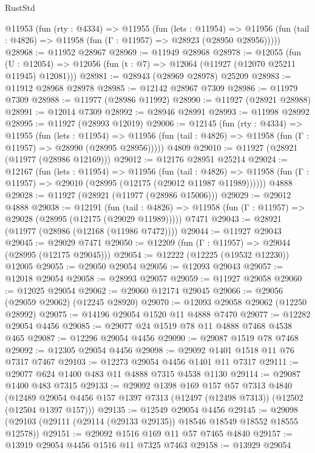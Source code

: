 \begin{lexlean}{RustStd}
\begin{coremodule}
  @11953
    (fun (rty : @4334) =>
    @11955
      (fun (lets : @11954) =>
      @11956 (fun (tail : @4826) => @11958 (fun (Γ : @11957) => @28923 (@28950 @28956)))))
@28968 := @11952 @28967
@28969 := @11949 @28968
@28978 := @12055
    (fun (U : @12054) => @12056 (fun (t : @7) => @12064 (@11927 (@12070 @25211 @11945) @12081)))
@28981 := @28943 (@28969 @28978) @25209
@28983 := @11912 @28968 @28978
@28985 := @12142 @28967 @7309
@28986 := @11979 @7309
@28988 := @11977 (@28986 @11992)
@28990 := @11927 (@28921 @28988)
@28991 := @12014 @7309
@28992 := @28946 @28991
@28993 := @11998 @28992
@28995 := @11927 (@28993 @12019)
@29006 := @12145
    (fun (rty : @4334) =>
    @11955
      (fun (lets : @11954) =>
      @11956 (fun (tail : @4826) => @11958 (fun (Γ : @11957) => @28990 (@28995 @28956)))))
    @4809
@29010 := @11927 (@28921 (@11977 (@28986 @12169)))
@29012 := @12176 @28951 @25214
@29024 := @12167
    (fun (lets : @11954) =>
    @11956
      (fun (tail : @4826) =>
      @11958 (fun (Γ : @11957) => @29010 (@28995 (@12175 (@29012 @11987 @11989))))))
    @4888
@29028 := @11927 (@28921 (@11977 (@28986 @15006)))
@29029 := @29012 @4888
@29038 := @12191
    (fun (tail : @4826) => @11958 (fun (Γ : @11957) => @29028 (@28995 (@12175 (@29029 @11989)))))
    @7471
@29043 := @28921 (@11977 (@28986 (@12168 (@11986 @7472))))
@29044 := @11927 @29043
@29045 := @29029 @7471
@29050 := @12209 (fun (Γ : @11957) => @29044 (@28995 (@12175 @29045)))
@29054 := @12222 (@12225 (@19532 @12230)) @12005
@29055 := @29050 @29054
@29056 := @12093 @29043
@29057 := @12018 @29054
@29058 := @28993 @29057
@29059 := @11927 @29058
@29060 := @12025 @29054
@29062 := @29060 @12174 @29045
@29066 := @29056 (@29059 @29062) (@12245 @28920)
@29070 := @12093 @29058 @29062 (@12250 @28992)
@29075 := @14196 @29054 @1520 @11 @4888 @7470
@29077 := @12282 @29054 @4456
@29085 := @29077 @24 @1519 @78 @11 @4888 @7468 @4538 @465
@29087 := @12296 @29054 @4456
@29090 := @29087 @1519 @78 @7468
@29092 := @12305 @29054 @4456
@29098 := @29092 @1401 @1518 @11 @76 @7317 @7467
@29103 := @12273 @29054 @4456 @1401 @11 @7317
@29111 := @29077 @624 @1400 @483 @11 @4888 @7315 @4538 @1130
@29114 := @29087 @1400 @483 @7315
@29133 := @29092
    @1398
    @169
    @157
    @57
    @7313
    @4840
    (@12489 @29054 @4456 @157 @1397 @7313 (@12497 (@12498 @7313)) (@12502 (@12504 @1397 @157)))
@29135 := @12549 @29054 @4456
@29145 := @29098 (@29103 (@29111 (@29114 (@29133 @29135)) @18546 @18549 @18552 @18555 @12578))
@29151 := @29092 @1516 @169 @11 @57 @7465 @4840
@29157 := @13919 @29054 @4456 @1516 @11 @7325 @7463
@29158 := @13929 @29054

\end{coremodule}
\end{lexlean}
